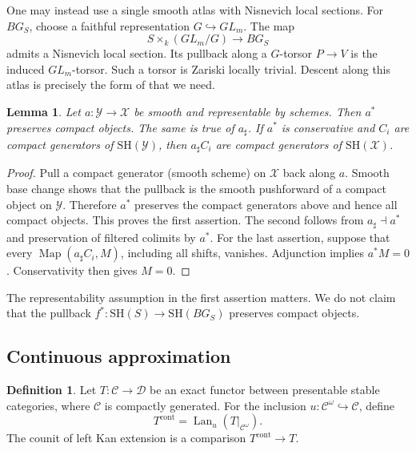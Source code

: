 \documentclass[11pt,reqno]{amsart}
\newtheorem{lemma}[theorem]{Lemma}
\theoremstyle{definition}
\newtheorem{definition}[theorem]{Definition}
\theoremstyle{remark}
\theoremstyle{plain}
\numberwithin{equation}{section}
\newcommand{\SH}{\mathrm{SH}}
\DeclareMathOperator{\Map}{Map}
\DeclareMathOperator{\Lan}{Lan}
\newcommand{\cont}{\mathrm{cont}}
\newcommand{\C}{\mathcal C}
\newcommand{\D}{\mathcal D}
\newcommand{\X}{\mathcal X}
\newcommand{\Y}{\mathcal Y}
\begin{document}
One may instead use a single smooth atlas with Nisnevich local sections.
For \(BG_S\), choose a faithful representation \(G\hookrightarrow GL_m\).
The map
\[
 S\times_k(GL_m/G)\longrightarrow BG_S
\]
admits a Nisnevich local section.
Its pullback along a \(G\)-torsor \(P\to V\) is the induced \(GL_m\)-torsor.
Such a torsor is Zariski locally trivial.
Descent along this atlas is precisely the form of \cite[Lemma~1.5]{KhanRavi} that we need.

\begin{lemma}\label{lem:compact-pullback}
Let \(a:\Y\to\X\) be smooth and representable by schemes.
Then \(a^*\) preserves compact objects.
The same is true of \(a_\sharp\).
If \(a^*\) is conservative and \(C_i\) are compact generators of \(\SH(\Y)\),
then \(a_\sharp C_i\) are compact generators of \(\SH(\X)\).
\end{lemma}
\begin{proof}
Pull a compact generator (smooth scheme) on \(\X\) back along \(a\).
Smooth base change shows that the pullback is the smooth pushforward of a compact object on \(\Y\).
Therefore \(a^*\) preserves the compact generators above and hence all compact objects.
This proves the first assertion.
The second follows from \(a_\sharp\dashv a^*\) and preservation of filtered colimits by \(a^*\).
For the last assertion, suppose that every \(\Map(a_\sharp C_i,M)\), including all shifts, vanishes.
Adjunction implies \(a^*M=0\).
Conservativity then gives \(M=0\).
\end{proof}

The representability assumption in the first assertion matters.
We do not claim that the pullback \(f^* : \SH(S)\to\SH(BG_S)\) preserves compact objects.

\subsection{Continuous approximation}
\begin{definition}\label{def:continuous}
Let \(T:\C\to\D\) be an exact functor between presentable stable categories, where \(\C\) is compactly generated.
For the inclusion \(u:\C^\omega\hookrightarrow\C\), define
\[
 T^{\cont}=\Lan_u(T|_{\C^\omega}).
\]
The counit of left Kan extension is a comparison \(T^{\cont}\to T\).
\end{definition}
\end{document}
